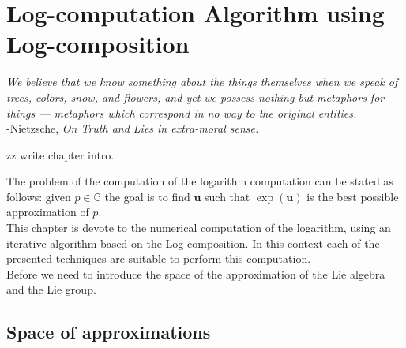 \chapter{Log-computation Algorithm using Log-composition}\label{ch:log_computations}

\begin{flushright}
	\emph{We believe that we know something about the things themselves when we speak of trees, colors, snow, and flowers; and yet we possess nothing but metaphors for things — metaphors which correspond in no way to the original entities.} \\ -Nietzsche, \emph{On Truth and Lies in extra-moral sense.}
\end{flushright}

zz write chapter intro.


The problem of the computation of the logarithm computation can be stated as follows:
given $p \in \mathbb{G}$ the goal is to find $\mathbf{u}$ such that $\exp(\mathbf{u})$ is the best possible approximation of $p$.  \\
This chapter is devote to the numerical computation of the logarithm, using an iterative algorithm based on the Log-composition. In this context each of the presented techniques are suitable to perform this computation.\\

Before we need to introduce the space of the approximation of the Lie algebra and the Lie group.


\section{Space of approximations}

